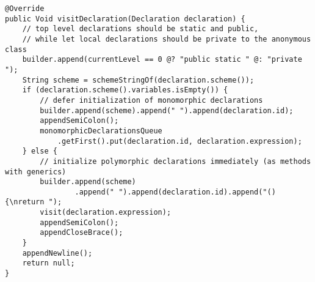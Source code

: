 \newpage

\begin{lstlisting}[caption={Metodo \texttt{visit} per le dichiarazioni}, style=javaCode, label={lst:5-13-visit-declaration-java}]
@Override
public Void visitDeclaration(Declaration declaration) {
    // top level declarations should be static and public,
    // while let local declarations should be private to the anonymous class
    builder.append(currentLevel == 0 @? "public static " @: "private ");
    String scheme = schemeStringOf(declaration.scheme());
    if (declaration.scheme().variables.isEmpty()) {
        // defer initialization of monomorphic declarations
        builder.append(scheme).append(" ").append(declaration.id);
        appendSemiColon();
        monomorphicDeclarationsQueue
            .getFirst().put(declaration.id, declaration.expression);
    } else {
        // initialize polymorphic declarations immediately (as methods with generics)
        builder.append(scheme)
                .append(" ").append(declaration.id).append("() {\nreturn ");
        visit(declaration.expression);
        appendSemiColon();
        appendCloseBrace();
    }
    appendNewline();
    return null;
}
\end{lstlisting}